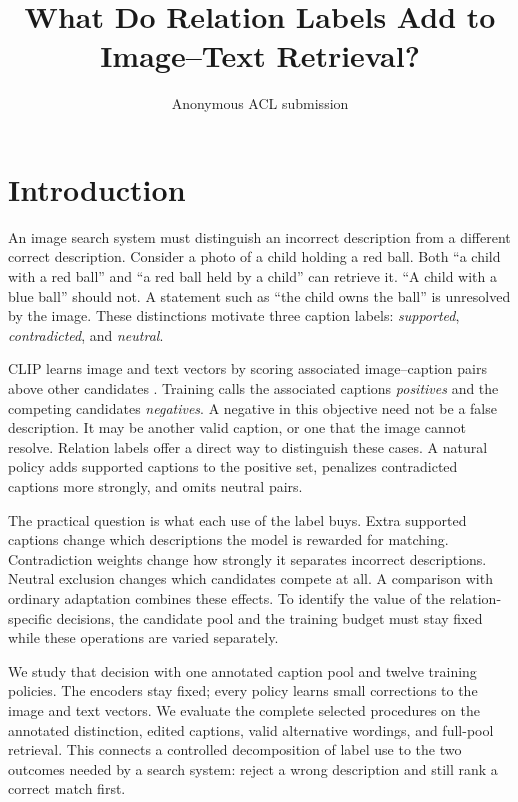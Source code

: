 \documentclass[11pt]{article}
\title{What Do Relation Labels Add to Image--Text Retrieval?}
\author{Anonymous ACL submission}
\begin{document}

\maketitle
\begin{abstract}

\end{abstract}

\section{Introduction}
An image search system must distinguish an incorrect description from a different correct description. Consider a photo of a child holding a red ball. Both ``a child with a red ball'' and ``a red ball held by a child'' can retrieve it. ``A child with a blue ball'' should not. A statement such as ``the child owns the ball'' is unresolved by the image. These distinctions motivate three caption labels: \emph{supported}, \emph{contradicted}, and \emph{neutral}.

CLIP learns image and text vectors by scoring associated image--caption pairs above other candidates \citep{radford2021clip}. Training calls the associated captions \emph{positives} and the competing candidates \emph{negatives}. A negative in this objective need not be a false description. It may be another valid caption, or one that the image cannot resolve. Relation labels offer a direct way to distinguish these cases. A natural policy adds supported captions to the positive set, penalizes contradicted captions more strongly, and omits neutral pairs.

The practical question is what each use of the label buys. Extra supported captions change which descriptions the model is rewarded for matching. Contradiction weights change how strongly it separates incorrect descriptions. Neutral exclusion changes which candidates compete at all. A comparison with ordinary adaptation combines these effects. To identify the value of the relation-specific decisions, the candidate pool and the training budget must stay fixed while these operations are varied separately.



We study that decision with one annotated caption pool and twelve training policies. The encoders stay fixed; every policy learns small corrections to the image and text vectors. We evaluate the complete selected procedures on the annotated distinction, edited captions, valid alternative wordings, and full-pool retrieval. This connects a controlled decomposition of label use to the two outcomes needed by a search system: reject a wrong description and still rank a correct match first.
\end{document}
